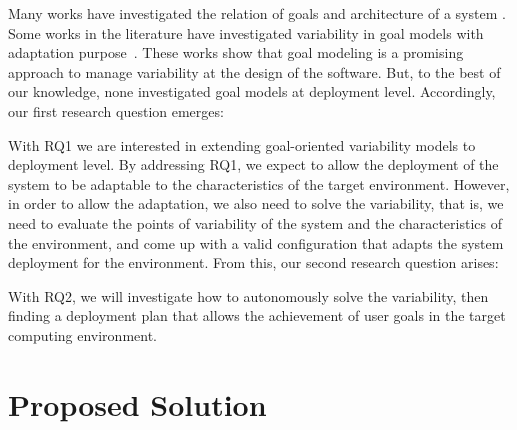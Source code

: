 
Many works have investigated the relation of goals and architecture of a system \cite{kramer_self-managed_2007}\cite{morandini_towards_2008}\citep{penserini_design_2007}\cite{pimentel_deriving_2012}\cite{van_lamsweerde_system_2003}.
Some works in the literature have investigated variability in goal models with adaptation purpose~\cite{angelopoulos_capturing_2015}\cite{yu_goals_2008}. These works show that goal modeling is a promising approach to manage variability at the design of the software. But, to the best of our knowledge, none investigated goal models at deployment level.
Accordingly, our first research question emerges:

\bigskip
 \setlength{\fboxsep}{12pt}
 \noindent{}\bigskip

With RQ1 we are interested in extending goal-oriented variability models to deployment level. By addressing RQ1, we expect to allow the deployment of the system to be adaptable to the characteristics of the target environment. However, in order to allow the adaptation, we also need to solve the variability, that is, we need to evaluate the points of variability of the system and the characteristics of the environment, and come up with a valid configuration that adapts the system deployment for the environment. From this, our second research question arises:

\bigskip
\setlength{\fboxsep}{10pt}
\noindent{}\bigskip

With RQ2, we will investigate how to autonomously solve the variability, then finding a deployment plan that allows the achievement of user goals in the target computing environment.

\section{Proposed Solution}

